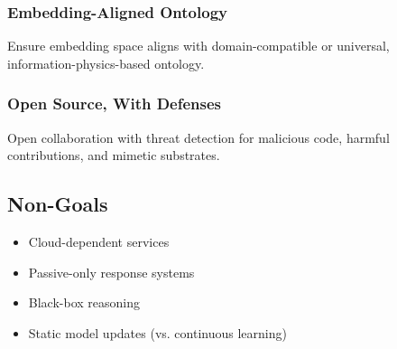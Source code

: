 \documentclass[12pt,a4paper]{article}
\providecommand{\tightlist}{\setlength{\itemsep}{0pt}\setlength{\parskip}{0pt}}
\begin{document}
\subsubsection{Embedding-Aligned
Ontology}\label{embedding-aligned-ontology}

Ensure embedding space aligns with domain-compatible or universal,
information-physics-based ontology.

\subsubsection{Open Source, With
Defenses}\label{open-source-with-defenses}

Open collaboration with threat detection for malicious code, harmful
contributions, and mimetic substrates.

\subsection{Non-Goals}\label{non-goals}

\begin{itemize}
\tightlist
\item
  Cloud-dependent services
\item
  Passive-only response systems
\item
  Black-box reasoning
\item
  Static model updates (vs. continuous learning)
\end{itemize}

\texttt{\textasciigrave{}}
\end{document}
